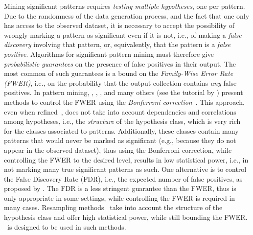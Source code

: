 Mining significant patterns requires \emph{testing multiple hypotheses}, one per
pattern. Due to the randomness of the data generation process, and the fact that
one only has access to the observed dataset, it is necessary to accept the
possibility of wrongly marking a pattern as significant even if it is not, i.e.,
of making a \emph{false discovery} involving that pattern, or, equivalently,
that the pattern is a \emph{false positive}. Algorithms for significant pattern
mining must therefore give \emph{probabilistic guarantees} on the presence of
false positives in their output. The most common of such guarantees is a bound
on the \emph{Family-Wise Error Rate (FWER)}, i.e., on the probability that the
output collection contains \emph{any} false positives. In pattern mining,
\citet{Webb06,Webb07}, \citet{Hamalainen10}, \citet{LowKRKP13}, and many others
(see the tutorial by \citet{HamalainenW19}) present methods to control the FWER
using the \emph{Bonferroni correction}~\citep{Bonferroni37}. This approach, even
when refined~\citep{Holm79,Webb08}, does not take into account dependencies and
correlations among hypotheses, i.e., the \emph{structure} of the hypothesis
class, which is very rich for the classes associated to patterns. Additionally,
these classes contain many patterns that would never be marked as significant
(e.g., because they do not appear in the observed dataset), thus using the
Bonferroni correction, while controlling the FWER to the desired level, results
in low statistical power, i.e., in not marking many true significant patterns as
such. One alternative is to control the False Discovery Rate (FDR), i.e., the
expected number of false positives, as proposed by \citet{KirschMPPUV12}. The
FDR is a less stringent guarantee than the FWER, thus is only appropriate in
some settings, while controlling the FWER is required in many cases. Resampling
methods~\citep{WestfallY93} take into account the structure of the hypothesis
class and offer high statistical power, while still bounding the FWER\@. \algo\
is designed to be used in such methods.


